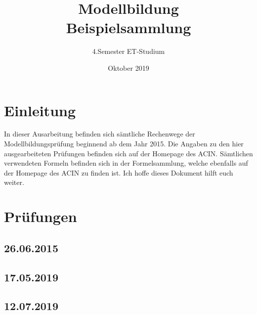 \documentclass[a4paper,12p]{article}
\title{\huge Modellbildung\\\large \huge Beispielsammlung}
\author{\huge 4.Semester ET-Studium}
\date{\huge Oktober 2019}
\begin{document}
	
	\maketitle
	\newpage
	\tableofcontents
	\newpage
	
	\section{Einleitung}
	In dieser Ausarbeitung befinden sich sämtliche Rechenwege der Modellbildungsprüfung beginnend ab dem Jahr 2015. Die Angaben zu den hier ausgearbeiteten Prüfungen befinden sich auf der Homepage des ACIN. Sämtlichen verwendeten Formeln befinden sich in der Formelsammlung, welche ebenfalls auf der Homepage des ACIN zu finden ist. Ich hoffe dieses Dokument hilft euch weiter. 
	
	\section{Prüfungen}
	
	\subsection{26.06.2015}
	
	
	\subsection{17.05.2019}
	
	
	
	\newpage
	\subsection{12.07.2019}
	
	
\end{document}
